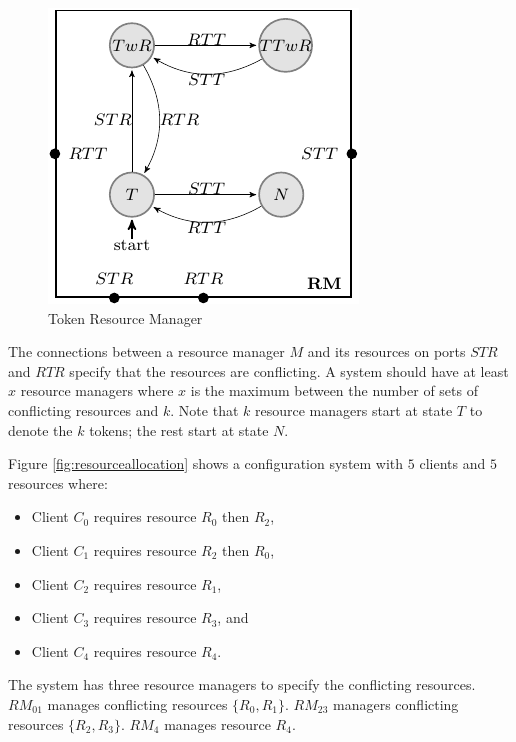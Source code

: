 \begin{figure}[H]
\begin{center}
\includegraphics[scale=1.2]{compiledfigures/token-crop.pdf}
\caption{Token Resource Manager}
\label{fig:conflict-token}
\end{center}
\end{figure}

The connections between a resource manager $M$ and its resources on ports $STR$ and $RTR$ specify that the 
resources are conflicting. 
A system should have at least $x$ resource managers where $x$ is the maximum between the number of sets of conflicting resources 
and $k$.
Note that $k$ resource managers start at state $T$ to denote the $k$ tokens; the rest start at state $N$. 

Figure \ref{fig:resourceallocation} shows a configuration system with $5$ clients and $5$ resources where:
\begin{itemize}
  \item Client $C_0$ requires resource $R_0$ then $R_2$,
  \item Client $C_1$ requires resource $R_2$ then $R_0$,
  \item Client $C_2$ requires resource $R_1$,
  \item Client $C_3$ requires resource $R_3$, and
  \item Client $C_4$ requires resource $R_4$.
\end{itemize}

The system has three resource managers to specify the conflicting resources. 
$RM_{01}$ manages conflicting resources $\{R_0,R_1\}$. 
$RM_{23}$ managers conflicting resources $\{R_2,R_3\}$.
$RM_{4}$ manages resource $R_4$. 


